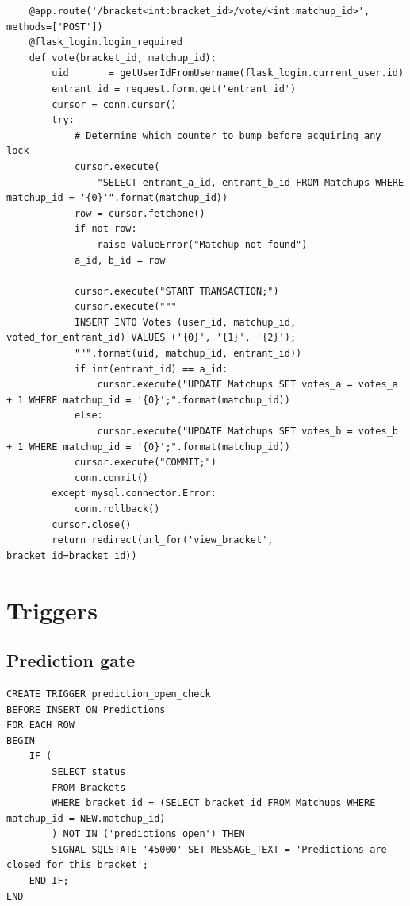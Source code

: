 \documentclass[11pt]{article}
\begin{document}
\begin{center}
\begin{verbatim}
    @app.route('/bracket<int:bracket_id>/vote/<int:matchup_id>', methods=['POST'])
    @flask_login.login_required
    def vote(bracket_id, matchup_id):
        uid       = getUserIdFromUsername(flask_login.current_user.id)
        entrant_id = request.form.get('entrant_id')
        cursor = conn.cursor()
        try:
            # Determine which counter to bump before acquiring any lock
            cursor.execute(
                "SELECT entrant_a_id, entrant_b_id FROM Matchups WHERE matchup_id = '{0}'".format(matchup_id))
            row = cursor.fetchone()
            if not row:
                raise ValueError("Matchup not found")
            a_id, b_id = row

            cursor.execute("START TRANSACTION;")
            cursor.execute("""
            INSERT INTO Votes (user_id, matchup_id, voted_for_entrant_id) VALUES ('{0}', '{1}', '{2}');
            """.format(uid, matchup_id, entrant_id))
            if int(entrant_id) == a_id:
                cursor.execute("UPDATE Matchups SET votes_a = votes_a + 1 WHERE matchup_id = '{0}';".format(matchup_id))
            else:
                cursor.execute("UPDATE Matchups SET votes_b = votes_b + 1 WHERE matchup_id = '{0}';".format(matchup_id))
            cursor.execute("COMMIT;")
            conn.commit()
        except mysql.connector.Error:
            conn.rollback()
        cursor.close()
        return redirect(url_for('view_bracket', bracket_id=bracket_id))

\end{verbatim}
\end{center}

\section{Triggers}

\subsection*{Prediction gate}
\begin{verbatim}
CREATE TRIGGER prediction_open_check
BEFORE INSERT ON Predictions
FOR EACH ROW
BEGIN
    IF (
        SELECT status 
        FROM Brackets 
        WHERE bracket_id = (SELECT bracket_id FROM Matchups WHERE matchup_id = NEW.matchup_id)
        ) NOT IN ('predictions_open') THEN
        SIGNAL SQLSTATE '45000' SET MESSAGE_TEXT = 'Predictions are closed for this bracket';
    END IF;
END
\end{verbatim}
\end{document}
